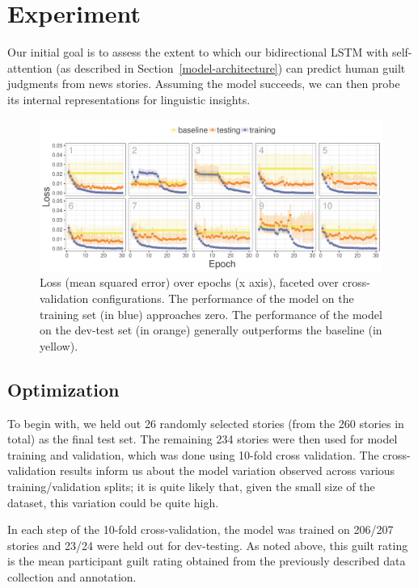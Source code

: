 \documentclass[11pt,a4paper]{article}
\begin{document}
\section{Experiment}

Our initial goal is to assess the extent to which our bidirectional LSTM with self-attention (as described in Section~\ref{model-architecture}) can predict human guilt judgments from news stories. Assuming the model succeeds, we can then probe its internal representations for linguistic insights.

\begin{figure}
  \includegraphics[width=\linewidth]{graphs/lossPlotCropped.pdf}
  \caption{Loss (mean squared error) over epochs (x axis), faceted over cross-validation configurations. The performance of the model on the training set (in blue) approaches zero. The performance of the model on the dev-test set (in orange) generally outperforms the baseline (in yellow).}
  \label{fig:loss}
\end{figure}

\subsection{Optimization}

To begin with, we held out 26 randomly selected stories (from the 260 stories in total) as the final test set. The remaining 234 stories were then used for model training and validation, which was done using 10-fold cross validation. The cross-validation results inform us about the model variation observed across  various training/validation splits; it is quite likely that, given the small size of the dataset, this variation could be quite high.

In each step of the 10-fold cross-validation, the model was trained on 206/207 stories and 23/24 were held out for dev-testing. As noted above, this guilt rating is the mean participant guilt rating obtained from the previously described data collection and annotation.
\end{document}
